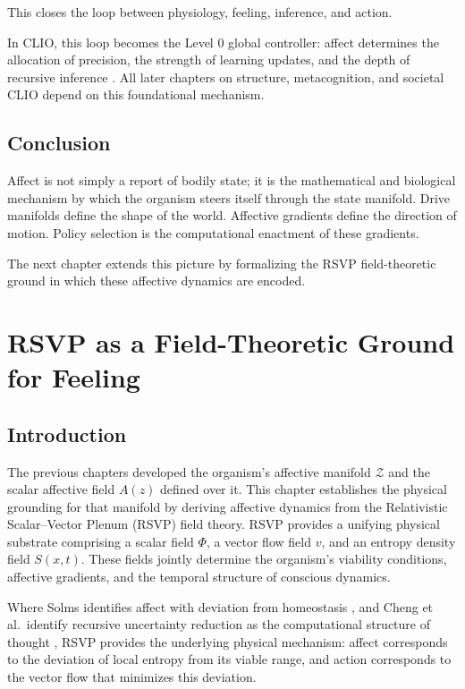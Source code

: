 \documentclass[12pt,oneside]{book}
\theoremstyle{plain}
\theoremstyle{definition}
\let\citep\parencite
\def\mathbf#1{#1}%
\begin{document}
This closes the loop between physiology, feeling, inference, and action.

In CLIO, this loop becomes the Level 0 global controller:
affect determines the allocation of precision, the strength of learning
updates, and the depth of recursive inference
\citep{cheng2025cognitive}.
All later chapters on structure, metacognition, and societal CLIO depend
on this foundational mechanism.

\section{Conclusion}

Affect is not simply a report of bodily state; it is the mathematical and
biological mechanism by which the organism steers itself through the state
manifold.
Drive manifolds define the shape of the world.
Affective gradients define the direction of motion.
Policy selection is the computational enactment of these gradients.

The next chapter extends this picture by formalizing the RSVP field-theoretic
ground in which these affective dynamics are encoded.

\chapter{RSVP as a Field-Theoretic Ground for Feeling}

\section{Introduction}

The previous chapters developed the organism's affective manifold
$\mathcal{Z}$ and the scalar affective field $A(z)$ defined over it.
This chapter establishes the physical grounding for that manifold by
deriving affective dynamics from the Relativistic Scalar--Vector Plenum
(RSVP) field theory.
RSVP provides a unifying physical substrate comprising a scalar field
$\Phi$, a vector flow field $\mathbf{v}$, and an entropy density field
$S(x,t)$.
These fields jointly determine the organism's viability conditions,
affective gradients, and the temporal structure of conscious dynamics.

Where Solms identifies affect with deviation from homeostasis
\citep{solms2021hidden},
and Cheng et al.\ identify recursive uncertainty reduction as the
computational structure of thought
\citep{cheng2025cognitive},
RSVP provides the underlying physical mechanism:
affect corresponds to the deviation of local entropy from its viable
range, and action corresponds to the vector flow that minimizes this
deviation.
\end{document}
